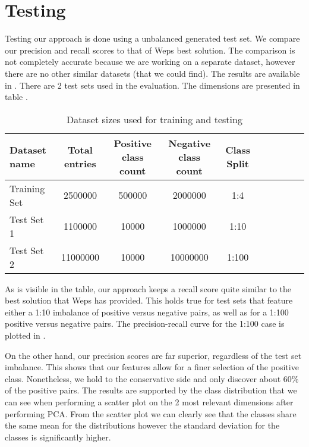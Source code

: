 
\section{Testing}
\label{section:testing}

Testing our approach is done using a unbalanced generated test set. We compare
our precision and recall scores to that of Weps best solution. The comparison
is not completely accurate because we are working on a separate dataset, however
there are no other similar datasets (that we could find). The results are available
in . There are 2 test sets used in the
evaluation. The dimensions are presented in table .

\begin{center}
\begin{table}[htb]
  \caption{Dataset sizes used for training and testing}
  \begin{tabular}{l*{8}{c}r}
    \textbf {Dataset name} & \textbf{Total entries} & \textbf{Positive class count} & \textbf{Negative class count} & \textbf{Class Split} \\
    \hline
    Training Set   & 2500000 & 500000 & 2000000 & 1:4\\
    Test Set 1     & 1100000 &  10000  & 1000000 & 1:10\\
    Test Set 2     & 11000000 & 10000  & 10000000 & 1:100\\
  \end{tabular}
  \label{table:datasets}
\end{table}
\end{center}


As is visible in the table, our approach
keeps a recall score quite similar to the best solution that Weps has provided.
This holds true for test sets that feature either a 1:10 imbalance of positive
versus negative pairs, as well as for a 1:100 positive versus negative pairs.
The precision-recall curve for the 1:100 case is plotted in
.

On the other hand, our precision scores are far superior, regardless of the test
set imbalance. This shows that our features allow for a finer selection
of the positive class. Nonetheless, we hold to the conservative side and only
discover about 60\% of the positive pairs. The results are supported by the
class distribution that we can see when performing a scatter plot on the 2
most relevant dimensions after performing PCA. 
From the scatter plot we can clearly see that the classes share the same mean for
the distributions however the standard deviation for the classes is significantly higher.

